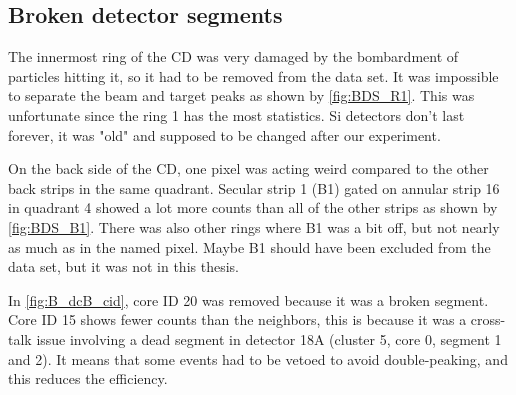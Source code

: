 \documentclass[twoside,english]{uiofysmaster/uiofysmaster}
\let\orgautoref\autoref
\renewcommand{\autoref}
        {%
		 \def\subsectionautorefname{Section}%
		 \def\subsubsectionautorefname{Section}%
          \orgautoref}
\begin{document}
\subsection{Broken detector segments}\label{sec:BDS}
The innermost ring of the CD was very damaged by the bombardment of particles hitting it, so it had to be removed from the data set. 
It was impossible to separate the beam and target peaks as shown by \autoref{fig:BDS_R1}.
This was unfortunate since the ring 1 has the most statistics. 
Si detectors don't last forever, it was "old" and supposed to be changed after our experiment. 

On the back side of the CD, one pixel was acting weird compared to the other back strips in the same quadrant. 
Secular strip 1 (B1) gated on annular strip 16 in quadrant 4 showed a lot more counts than all of the other strips as shown by \autoref{fig:BDS_B1}. 
There was also other rings where B1 was a bit off, but not nearly as much as in the named pixel. 
Maybe B1 should have been excluded from the data set, but it was not in this thesis.

In \autoref{fig:B_dcB_cid}, core ID 20 was removed because it was a broken segment. 
Core ID 15 shows fewer counts than the neighbors, this is because it was a cross-talk issue involving a dead segment in detector 18A (cluster 5, core 0, segment 1 and 2). 
It means that some events had to be vetoed to avoid double-peaking, and this reduces the efficiency. 
\end{document}

